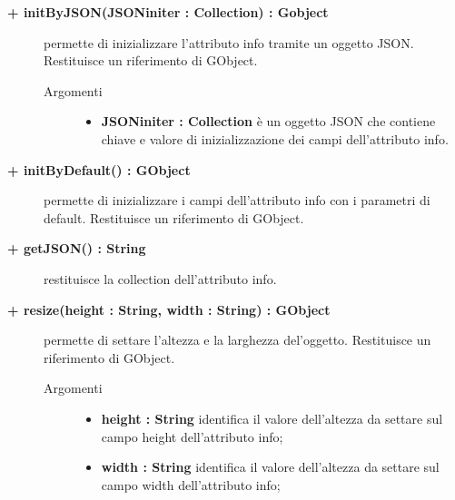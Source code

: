 \begin{description}
\begin{description}
		\item[\textbf{\color{blue}+ initByJSON(JSONiniter : Collection) : Gobject			}] \hfill
			permette di inizializzare l'attributo info tramite un oggetto JSON. Restituisce un riferimento di GObject. 
			
		\begin{description}
			\item[Argomenti] \hfill
				\begin{itemize}
				
					\item \textbf{JSONiniter : Collection			} \hfill
					è un oggetto JSON che contiene chiave e valore di inizializzazione dei campi dell'attributo info. 
				\end{itemize}
		\end{description}

\end{description}

\begin{description}
		\item[\textbf{\color{blue}+ initByDefault() : GObject			}] \hfill
			permette di inizializzare i campi dell'attributo info con i parametri di default. Restituisce un riferimento di GObject.

\end{description}

\begin{description}
		\item[\textbf{\color{blue}+ getJSON() : String			}] \hfill
			restituisce la collection dell'attributo info.

\end{description}

\begin{description}
		\item[\textbf{\color{blue}+ resize(height : String, width : String) : GObject			}] \hfill
			permette di settare l'altezza e la larghezza del'oggetto. Restituisce un riferimento di GObject.
			
		\begin{description}
			\item[Argomenti] \hfill
				\begin{itemize}
				
					\item \textbf{height : String			} \hfill
					identifica il valore dell'altezza da settare sul campo height dell'attributo info;
					\item \textbf{width : String			} \hfill
					identifica il valore dell'altezza da settare sul campo width dell'attributo info;				
				\end{itemize}
		\end{description}
		

\end{description}
\end{description}
